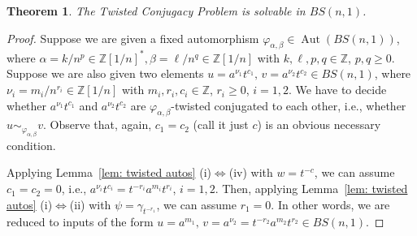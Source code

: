 \documentclass[english]{amsart}
\newtheorem{thm}{Theorem}[section]
\theoremstyle{definition}
\newcommand\ZZ{\mathbb{Z}}
\newcommand{\Aut}{\operatorname{Aut}}
\begin{document}
\begin{thm}\label{thm: main TCP}
The Twisted Conjugacy Problem is solvable in $BS(n,1)$.
\end{thm}

\begin{proof}
Suppose we are given a fixed automorphism $\varphi_{\alpha, \beta}\in \Aut(BS(n,1))$, 
where $\alpha=k/n^p \in \ZZ[1/n]^*, \beta=\ell/n^q\in \ZZ[1/n]$ with $k,\ell, p,q\in \ZZ$, $p,q\geq 0$. Suppose we are also given two elements $u=a^{\nu_1}t^{c_1},\, v=a^{\nu_2}t^{c_2}\in BS(n,1)$, where $\nu_i =m_i/n^{r_i}\in \ZZ[1/n]$ with $m_i, r_i, c_i\in \ZZ$, $r_i\geq 0$, $i=1,2$. We have to decide whether $a^{\nu_1}t^{c_1}$ and $a^{\nu_2}t^{c_2}$ are $\varphi_{\alpha, \beta}$-twisted conjugated to each other, i.e., whether $u\sim_{\varphi_{\alpha, \beta}} v$. Observe that, again, $c_1=c_2$ (call it just $c$) is an obvious necessary condition. 

Applying Lemma~\ref{lem: twisted autos} (i)$\Leftrightarrow$(iv) with $w=t^{-c}$, we can assume $c_1=c_2=0$, i.e., $a^{\nu_i}t^{c_i}=t^{-r_i}a^{m_i}t^{r_i}$, $i=1,2$. Then, applying Lemma~\ref{lem: twisted autos} (i)$\Leftrightarrow$(ii) with $\psi=\gamma_{t^{-r_1}}$, we can assume $r_1=0$. In other words, we are reduced to inputs of the form $u=a^{m_1},\, v=a^{\nu_2}=t^{-r_2}a^{m_2}t^{r_2}\in BS(n,1)$.


\end{proof}
\end{document}

